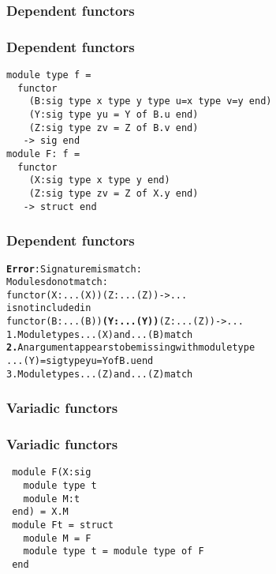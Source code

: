 \documentclass[a4paper,11pt]{beamer}
\begin{document}
\begin{frame}[fragile]\frametitle{Dependent functors}
\end{frame}


\begin{frame}[fragile]\frametitle{Dependent functors}
\begin{verbatim}
module type f =
  functor
    (B:sig type x type y type u=x type v=y end)
    (Y:sig type yu = Y of B.u end)
    (Z:sig type zv = Z of B.v end)
   -> sig end
module F: f =
  functor
    (X:sig type x type y end)
    (Z:sig type zv = Z of X.y end)
   -> struct end
\end{verbatim}
\end{frame}

\begin{frame}[fragile]\frametitle{Dependent functors}
\begin{alltt}
{\bfseries{}\color{red}{}Error}: Signature mismatch:
       Modules do not match:
         functor {\color{green}{}(X : ...(X))} {\color{red}{}\bfseries{}} {\color{green}{}(Z : ...(Z))} -> ...
       is not included in
         functor {\color{green}{}(B : ...(B))} {\color{red}{}\bfseries{}(Y : ...(Y))} {\color{green}{}(Z : ...(Z))} -> ...
  {\color{green}{}1.} Module types ...(X) and ...(B) match
  {\color{red}{}\bfseries{}2.} An argument appears to be missing with module type
         ...(Y) = sig type yu = Y of B.u end
  {\color{green}{}3.} Module types ...(Z) and ...(Z) match
\end{alltt}
\end{frame}


\begin{frame}[fragile]\frametitle{Variadic functors}
\end{frame}

\begin{frame}[fragile]\frametitle{Variadic functors}
 \begin{verbatim}
 module F(X:sig
   module type t
   module M:t
 end) = X.M
 module Ft = struct
   module M = F
   module type t = module type of F
 end
\end{verbatim}
\end{frame}
\end{document}
